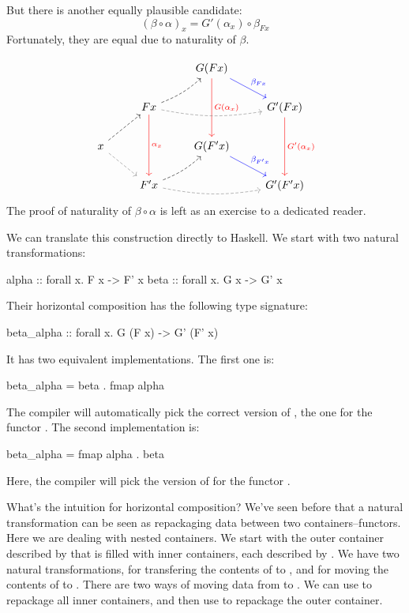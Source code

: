 \documentclass[DaoFP]{subfiles}
\begin{document}
But there is another equally plausible candidate: 
\[ (\beta \circ \alpha)_x = G'(\alpha_x) \circ \beta_{F x}\]
Fortunately, they are equal due to naturality of $\beta$. 

\[
 \begin{tikzcd}
  && G(F x)
  \arrow[dd, red, "G(\alpha_x)"]
  \arrow[dr, blue, "\beta_{F x}"]
  \\
  & F x
  \arrow[rr, bend right=10, dashed, gray]
  \arrow[ur, bend right=10, dashed]
  \arrow[dd, red, "\alpha_x"]
 && G' (F x)
  \arrow[dd, red, "G'(\alpha_x)"]
 \\
 x
 \arrow[ur, dashed]
 \arrow[dr, gray, dashed]
 && G(F' x)
  \arrow[dr, blue, "\beta_{F' x}"]
 \\
 &F' x
  \arrow[rr, bend right=10, dashed, gray]
 \arrow[ur, bend right=10, dashed]
 && G'(F' x)
\end{tikzcd}
\]
The proof of naturality of $\beta \circ \alpha$ is left as an exercise to a dedicated reader.

We can translate this construction directly to Haskell. We start with two natural transformations:
\begin{haskell}
alpha :: forall x. F x -> F' x
beta  :: forall x. G x -> G' x
\end{haskell}
Their horizontal composition has the following type signature:
\begin{haskell}
beta_alpha :: forall x. G (F x) -> G' (F' x)
\end{haskell}
It has two equivalent implementations. The first one is:
\begin{haskell}
beta_alpha = beta . fmap alpha
\end{haskell}
The compiler will automatically pick the correct version of , the one for the functor . The second implementation is:
\begin{haskell}
beta_alpha = fmap alpha . beta
\end{haskell}
Here, the compiler will pick the version of  for the functor .

What's the intuition for horizontal composition? We've seen before that a natural transformation can be seen as repackaging data between two containers--functors. Here we are dealing with nested containers. We start with the outer container described by  that is filled with inner containers, each described by . We have two natural transformations,  for transfering the contents of  to , and  for moving the contents of  to . There are two ways of moving data from  to . We can use  to repackage all inner containers, and then use  to repackage the outer container. 
\end{document}
